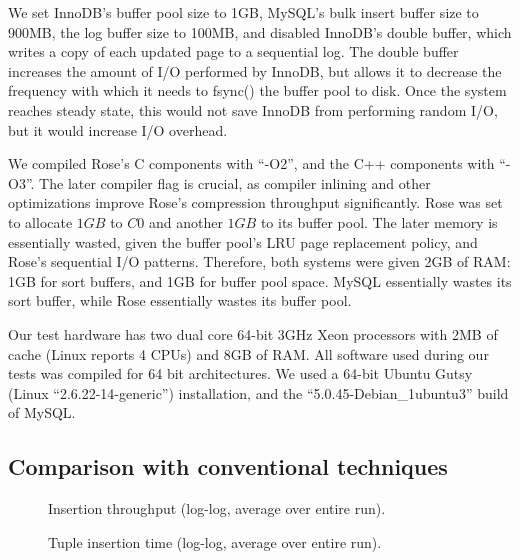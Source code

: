 \documentclass{vldb}
\newcommand{\rows}{Rose\xspace}
\newcommand{\rowss}{Rose's\xspace}
\begin{document}

We set InnoDB's buffer pool size to 1GB, MySQL's bulk insert buffer
size to 900MB, the log buffer size to 100MB, and disabled InnoDB's
double buffer, which writes a copy of each updated page
to a sequential log.  The double buffer increases the amount of I/O
performed by InnoDB, but allows it to decrease the frequency with
which it needs to fsync() the buffer pool to disk.  Once the system
reaches steady state, this would not save InnoDB from performing
random I/O, but it would increase I/O overhead.

We compiled \rowss C components with ``-O2'', and the C++ components
with ``-O3''.  The later compiler flag is crucial, as compiler
inlining and other optimizations improve \rowss compression throughput
significantly.  \rows was set to allocate $1GB$ to $C0$ and another
$1GB$ to its buffer pool.  The later memory is essentially wasted,
given the buffer pool's LRU page replacement policy, and \rowss
sequential I/O patterns.  Therefore, both systems were given 2GB of
RAM: 1GB for sort buffers, and 1GB for buffer pool space.  MySQL
essentially wastes its sort buffer, while \rows essentially wastes its
buffer pool.

Our test hardware has two dual core 64-bit 3GHz Xeon processors with
2MB of cache (Linux reports 4 CPUs) and 8GB of RAM.  All software used during our tests
was compiled for 64 bit architectures.  We used a 64-bit Ubuntu Gutsy
(Linux ``2.6.22-14-generic'') installation, and the
``5.0.45-Debian\_1ubuntu3'' build of MySQL.

\subsection{Comparison with conventional techniques}

\begin{figure}
\centering {}
\caption{Insertion throughput (log-log, average over entire run).}
\label{fig:avg-thru}
\end{figure}
\begin{figure}
\centering
{}
\caption{Tuple insertion time (log-log, average over entire run).}
\label{fig:avg-tup}
\end{figure}
\end{document}
